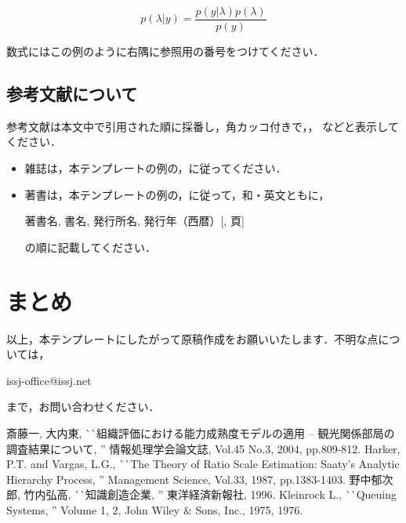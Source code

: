 \documentclass[dvipdfmx]{issj}
\begin{document}
\begin{equation}
	p( \lambda \vert y  ) = \frac{p( y \vert \lambda ) p( \lambda )}{p( y )}
\end{equation}


数式にはこの例のように右隅に参照用の番号をつけてください．

\subsection{参考文献について}  %

参考文献は本文中で引用された順に採番し，角カッコ付きで\cite{bib:SO2004}，\cite{bib:HV1987}，
\cite{bib:NT1996}などと表示してください．

\begin{itemize}
\item[] 雑誌は，本テンプレートの例の\cite{bib:SO2004}，\cite{bib:HV1987}に従ってください．
\item[] 著書は，本テンプレートの例の\cite{bib:NT1996}，\cite{bib:K19751976}に従って，和・英文ともに，
      \begin{center}
          著書名, 書名, 発行所名, 発行年（西暦）[, 頁]
      \end{center}の順に記載してください．
\end{itemize}

\section{まとめ}  %

以上，本テンプレートにしたがって原稿作成をお願いいたします．不明な点については，
\begin{center}
    issj-office@issj.net
\end{center}
まで，お問い合わせください．

\begin{thebibliography}{99}
   斎藤一, 大内東, 
                       ^^ ^^ 組織評価における能力成熟度モデルの適用 -- 観光関係部局の調査結果について, '' 
                       情報処理学会論文誌, Vol.45 No.3, 2004, pp.809-812.
   Harker, P.T. and Vargas, L.G., 
                       ^^ ^^ The Theory of Ratio Scale Estimation: Saaty’s Analytic Hierarchy Process, '' 
                       Management Science, Vol.33, 1987, pp.1383-1403.
   野中郁次郎, 竹内弘高, ^^ ^^ 知識創造企業, '' 東洋経済新報社, 1996.
    Kleinrock L., 
                       ^^ ^^ Queuing Systems, '' Volume 1, 2, John Wiley \& Sons, Inc., 1975, 1976.
\end{thebibliography}
\end{document}
